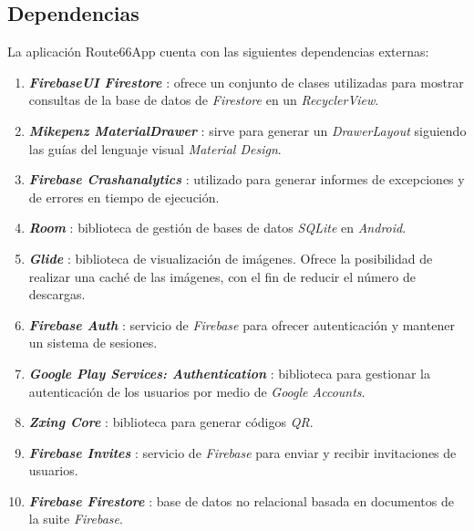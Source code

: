 \documentclass[twoside]{report}
\begin{document}
\subsection{Dependencias}

La aplicación Route66App cuenta con las siguientes dependencias externas:
\begin{enumerate}
\item \textbf{\textit{FirebaseUI Firestore}} \cite{firebaseuifirestore}: ofrece un conjunto de clases utilizadas para mostrar consultas de la base de datos de \textit{Firestore} en un \textit{RecyclerView}.

\item  \textbf{\textit{Mikepenz MaterialDrawer}} \cite{mikepenzmaterialdrawer}: sirve para generar un \textit{DrawerLayout} siguiendo las guías del lenguaje visual \textit{Material Design}.

\item \textbf{\textit{Firebase Crashanalytics}} \cite{crashanalyticsfb}: utilizado para generar informes de excepciones y de errores en tiempo de ejecución.

\item \textbf{\textit{Room}} \cite{roomdependencies}: biblioteca de gestión de bases de datos \textit{SQLite} en \textit{Android}.

\item \textbf{\textit{Glide}} \cite{glidedependencies}: biblioteca de visualización de imágenes. Ofrece la posibilidad de realizar una caché de las imágenes, con el fin de reducir el número de descargas.

\item \textbf{\textit{Firebase Auth}} \cite{firebaseauthdependencies}: servicio de \textit{Firebase} para ofrecer autenticación y mantener un sistema de sesiones.

\item \textbf{\textit{Google Play Services: Authentication}} \cite{googleservicesauthdependencies}: biblioteca para gestionar la autenticación de los usuarios por medio de \textit{Google Accounts}.

\item \textbf{\textit{Zxing Core}} \cite{zxingdependencies}: biblioteca para generar códigos \textit{QR}.

\item \textbf{\textit{Firebase Invites}} \cite{finvitesdependencies}: servicio de \textit{Firebase} para enviar y recibir invitaciones de usuarios.

\item \textbf{\textit{Firebase Firestore}} \cite{ffirestoredependencies}: base de datos no relacional basada en documentos de la suite \textit{Firebase}.


\end{enumerate}
\end{document}
